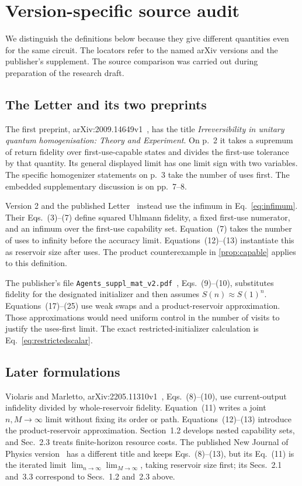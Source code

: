 \section{Version-specific source audit}\label{app:audit}

We distinguish the definitions below because they give different quantities even for the same circuit. The locators refer to the named arXiv versions and the publisher's supplement. The source comparison was carried out during preparation of the research draft.

\subsection{The Letter and its two preprints}

The first preprint, arXiv:2009.14649v1~\cite{prlv1}, has the title \emph{Irreversibility in unitary quantum homogenisation: Theory and Experiment}. On p.~2 it takes a supremum of return fidelity over first-use-capable states and divides the first-use tolerance by that quantity. Its general displayed limit has one limit sign with two variables. The specific homogenizer statements on p.~3 take the number of uses first. The embedded supplementary discussion is on pp.~7--8.

Version 2 and the published Letter~\cite{prl} instead use the infimum in Eq.~\eqref{eq:infimum}. Their Eqs.~(3)--(7) define squared Uhlmann fidelity, a fixed first-use numerator, and an infimum over the first-use capability set. Equation~(7) takes the number of uses to infinity before the accuracy limit. Equations~(12)--(13) instantiate this as reservoir size after uses. The product counterexample in \cref{prop:capable} applies to this definition.

The publisher's file \texttt{Agents\_suppl\_mat\_v2.pdf}~\cite{supp}, Eqs.~(9)--(10), substitutes fidelity for the designated initializer and then assumes $S(n)\approx S(1)^n$. Equations~(17)--(25) use weak swaps and a product-reservoir approximation. Those approximations would need uniform control in the number of visits to justify the uses-first limit. The exact restricted-initializer calculation is Eq.~\eqref{eq:restrictedscalar}.

\subsection{Later formulations}

Violaris and Marletto, arXiv:2205.11310v1~\cite{vm}, Eqs.~(8)--(10), use current-output infidelity divided by whole-reservoir fidelity. Equation~(11) writes a joint $n,M\to\infty$ limit without fixing its order or path. Equations~(12)--(13) introduce the product-reservoir approximation. Section~1.2 develops nested capability sets, and Sec.~2.3 treats finite-horizon resource costs. The published New Journal of Physics version~\cite{vm} has a different title and keeps Eqs.~(8)--(13), but its Eq.~(11) is the iterated limit $\lim_{n\to\infty}\lim_{M\to\infty}$, taking reservoir size first; its Secs.~2.1 and~3.3 correspond to Secs.~1.2 and~2.3 above.


